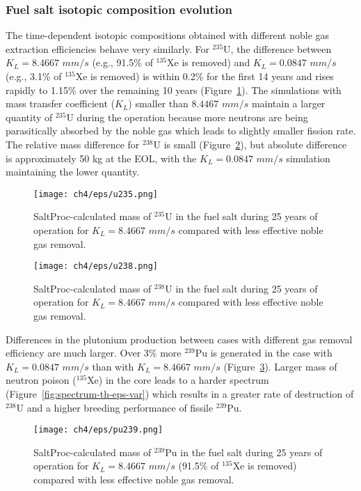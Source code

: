 \subsubsection{Fuel salt isotopic composition evolution}
The time-dependent isotopic compositions obtained with different noble gas 
extraction efficiencies behave very similarly. For $^{235}$U, the difference 
between $K_L=8.4667$ $mm/s$ (e.g., 91.5\% of $^{135}$Xe is removed) and 
$K_L=0.0847$ $mm/s$ (e.g., 3.1\% of $^{135}$Xe is removed) is within 0.2\% for 
the first 14 years and rises rapidly to 1.15\% over the remaining 10 years  
(Figure~\ref{fig:u235-eps-var}). The simulations with mass transfer  
coefficient ($K_L$) smaller than $8.4467$ $mm/s$ maintain a larger quantity of 
$^{235}$U during the operation because more neutrons are being parasitically 
absorbed by the noble gas which leads to slightly smaller fission rate. The 
relative mass difference for $^{238}$U is small 
(Figure~\ref{fig:u238-eps-var}), but absolute difference is approximately 50 
kg at the \gls{EOL}, with the $K_L=0.0847$ $mm/s$ simulation maintaining the 
lower quantity.
\begin{figure}[hbp!] %
	\centering
	\texttt{[image: ch4/eps/u235.png]}
	\caption{SaltProc-calculated mass of $^{235}$U in the fuel salt during 
		25 years of operation for $K_L=8.4667$ $mm/s$ compared with less 
		effective noble gas removal.}
	\label{fig:u235-eps-var}
\end{figure}

\begin{figure}[htp!] %
	\centering
	\texttt{[image: ch4/eps/u238.png]}
	\caption{SaltProc-calculated mass of $^{238}$U in the fuel salt during 
		25 years of operation for $K_L=8.4667$ $mm/s$ compared with less 
		effective noble gas removal.}
	\label{fig:u238-eps-var}
\end{figure}

Differences in the plutonium production between cases with different gas 
removal efficiency are much larger. Over 3\% more $^{239}$Pu is generated in 
the case with $K_L=0.0847$ $mm/s$ than with $K_L=8.4667$ $mm/s$ 
(Figure~\ref{fig:pu239-eps-var}). Larger mass of neutron poison ($^{135}$Xe) 
in the core leads to a harder spectrum (Figure~\ref{fig:spectrum-th-eps-var}) 
which results in a greater rate of destruction of $^{238}$U and a higher 
breeding performance of fissile $^{239}$Pu.
\begin{figure}[hbp!] %
	\centering
	\texttt{[image: ch4/eps/pu239.png]}
	\caption{SaltProc-calculated mass of $^{239}$Pu in the fuel salt during 
		25 years of operation for $K_L=8.4667$ $mm/s$ (91.5\% of $^{135}$Xe is 
		removed) compared with less effective noble gas removal.}
	\label{fig:pu239-eps-var}
\end{figure}


